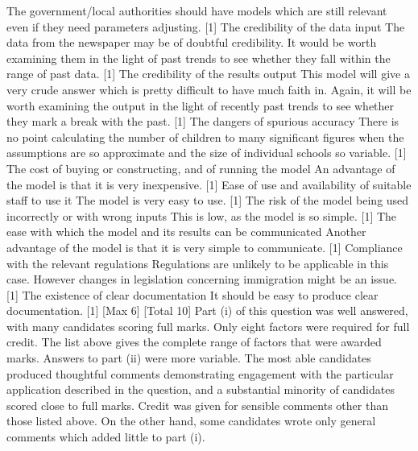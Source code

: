 The government/local authorities should have models which are still relevant even if
they need parameters adjusting.
[1]
The credibility of the data input
The data from the newspaper may be of doubtful credibility. It would be worth
examining them in the light of past trends to see whether they fall within the range of
past data.
[1]
The credibility of the results output
This model will give a very crude answer which is pretty difficult to have much faith
in. Again, it will be worth examining the output in the light of recently past trends to
see whether they mark a break with the past.
[1]
The dangers of spurious accuracy
There is no point calculating the number of children to many significant figures when
the assumptions are so approximate and the size of individual schools so variable. [1]
The cost of buying or constructing, and of running the model
An advantage of the model is that it is very inexpensive. [1]
Ease of use and availability of suitable staff to use it
The model is very easy to use. [1]
The risk of the model being used incorrectly or with wrong inputs
This is low, as the model is so simple. [1]
The ease with which the model and its results can be communicated
Another advantage of the model is that it is very simple to communicate.
[1]
Compliance with the relevant regulations
Regulations are unlikely to be applicable in this case. However changes in legislation
concerning immigration might be an issue.
[1]
The existence of clear documentation
It should be easy to produce clear documentation.
[1]
[Max 6]
[Total 10]
Part (i) of this question was well answered, with many candidates scoring full
marks. Only eight factors were required for full credit. The list above gives
the complete range of factors that were awarded marks. Answers to part (ii)
were more variable. The most able candidates produced thoughtful
comments demonstrating engagement with the particular application
described in the question, and a substantial minority of candidates scored
close to full marks. Credit was given for sensible comments other than those
listed above. On the other hand, some candidates wrote only general
comments which added little to part (i).
